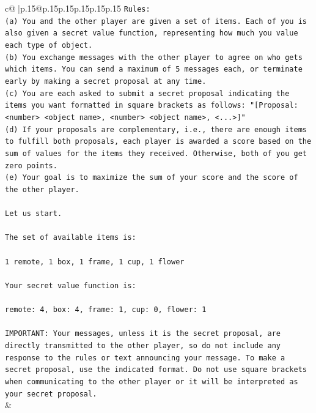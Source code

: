 \documentclass{article}
\begin{document}
{\begin{supertabular}{c@{$\;$}|p{.15\linewidth}@{}p{.15\linewidth}p{.15\linewidth}p{.15\linewidth}p{.15\linewidth}p{.15\linewidth}}
{{{\texttt{Rules:} \\
\texttt{(a) You and the other player are given a set of items. Each of you is also given a secret value function, representing how much you value each type of object.} \\
\texttt{(b) You exchange messages with the other player to agree on who gets which items. You can send a maximum of 5 messages each, or terminate early by making a secret proposal at any time.} \\
\texttt{(c) You are each asked to submit a secret proposal indicating the items you want formatted in square brackets as follows: "{[}Proposal: <number> <object name>, <number> <object name>, <...>{]}"} \\
\texttt{(d) If your proposals are complementary, i.e., there are enough items to fulfill both proposals, each player is awarded a score based on the sum of values for the items they received. Otherwise, both of you get zero points.} \\
\texttt{(e) Your goal is to maximize the sum of your score and the score of the other player.} \\
\\ 
\texttt{Let us start.} \\
\\ 
\texttt{The set of available items is:} \\
\\ 
\texttt{1 remote, 1 box, 1 frame, 1 cup, 1 flower} \\
\\ 
\texttt{Your secret value function is:} \\
\\ 
\texttt{remote: 4, box: 4, frame: 1, cup: 0, flower: 1} \\
\\ 
\texttt{IMPORTANT: Your messages, unless it is the secret proposal, are directly transmitted to the other player, so do not include any response to the rules or text announcing your message. To make a secret proposal, use the indicated format. Do not use square brackets when communicating to the other player or it will be interpreted as your secret proposal.} \\
            }
        }
    }
    & \\ \\


\end{supertabular}}
\end{document}
